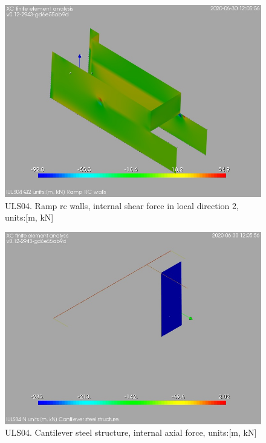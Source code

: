 \begin{figure}
\begin{center}
\includegraphics[width=\linewidth]{ramp_wall/resLC/text/graphics/resSimplLC/lULS04wallsQ2}
\caption{ULS04. Ramp rc walls, internal shear force in local direction 2, units:[m, kN]}
\end{center}
\end{figure}
\begin{figure}
\begin{center}
\includegraphics[width=\linewidth]{ramp_wall/resLC/text/graphics/resSimplLC/lULS04steelMembersN}
\caption{ULS04. Cantilever steel structure, internal axial force, units:[m, kN]}
\end{center}
\end{figure}
